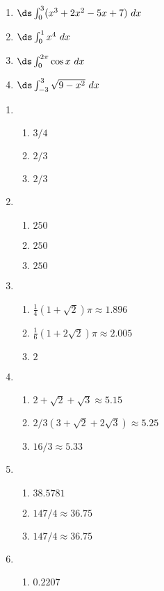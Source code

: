 \begin{enumialphparenastyle}
\begin{ex}
\begin{enumerate}
\item {$\ds \int_{0}^{3} (x^3+2x^2-5x+7)\ dx$}

\item {$\ds \int_{0}^{1} x^4\ dx$}

\item {$\ds \int_{0}^{2\pi} \cos x\ dx$}

\item {$\ds \int_{-3}^{3} \sqrt{9-x^2} \ dx$}

\end{enumerate}

\begin{sol}
\begin{enumerate}
\item {\begin{enumerate}
\item		$3/4$
\item		$2/3$
\item		$2/3$
\end{enumerate}
}
\item {\begin{enumerate}
\item		$250$
\item		$250$
\item		$250$
\end{enumerate}
}
\item {\begin{enumerate}
\item		$\frac14(1+\sqrt2)\pi\approx 1.896$
\item		$\frac1{6}(1+2\sqrt{2})\pi\approx 2.005$
\item		$2$
\end{enumerate}
}
\item {\begin{enumerate}
\item		$2+\sqrt2+\sqrt3\approx 5.15$
\item		$2/3(3+\sqrt2+2\sqrt3)\approx 5.25$
\item		$16/3\approx 5.33$
\end{enumerate}
}
\item {\begin{enumerate}
\item		$38.5781$
\item		$147/4\approx 36.75$
\item		$147/4\approx 36.75$
\end{enumerate}
}
\item {\begin{enumerate}
\item		$0.2207$

\end{enumerate}}
\end{enumerate}
\end{sol}
\end{ex}
\end{enumialphparenastyle}
